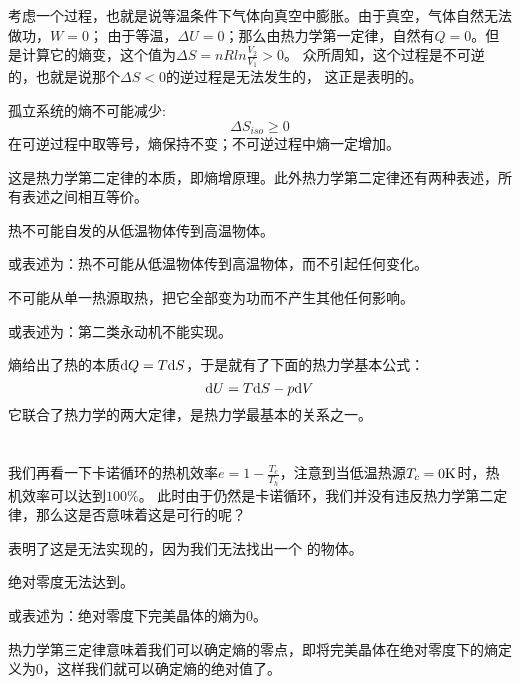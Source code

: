             考虑一个过程，也就是说等温条件下气体向真空中膨胀。由于真空，气体自然无法做功，$W=0$；
            由于等温，$\Delta U=0$；那么由热力学第一定律，自然有$Q=0$。但是计算它的熵变，这个值为$\Delta S = nRln\frac{V_2}{V_1}>0$。
            众所周知，这个过程是不可逆的，也就是说那个$\Delta S<0$的逆过程是无法发生的，
            这正是表明的。
            \begin{law}
                孤立系统的熵不可能减少:
                \begin{equation}
                    \Delta S_{iso} \geq 0
                    \nonumber
                \end{equation}
                在可逆过程中取等号，熵保持不变；不可逆过程中熵一定增加。
            \end{law}
            这是热力学第二定律的本质，即熵增原理。此外热力学第二定律还有两种表述，所有表述之间相互等价。
            \begin{law}
                热不可能自发的从低温物体传到高温物体。

                或表述为：热不可能从低温物体传到高温物体，而不引起任何变化。
            \end{law}
            \begin{law}
                不可能从单一热源取热，把它全部变为功而不产生其他任何影响。

                或表述为：第二类永动机不能实现。
            \end{law}
            熵给出了热的本质$\mathrm{d}{Q} = T\mathrm{d}{S}$，于是就有了下面的热力学基本公式：
            \begin{equation}
                \mathrm{d}{U} = T\mathrm{d}{S}-p\mathrm{d}{V}
                \nonumber
            \end{equation}
            它联合了热力学的两大定律，是热力学最基本的关系之一。
    \section[热力学第三定律]{}
        我们再看一下卡诺循环的热机效率$e = 1-\frac{T_c}{T_h}$，注意到当低温热源$T_c = 0 \rm{K}$时，热机效率可以达到$100\%$。
        此时由于仍然是卡诺循环，我们并没有违反热力学第二定律，那么这是否意味着这是可行的呢？

        表明了这是无法实现的，因为我们无法找出一个\linebreak{}
        的物体。
        \begin{law}
            绝对零度无法达到。

            或表述为：绝对零度下完美晶体的熵为$0$。
        \end{law}
        热力学第三定律意味着我们可以确定熵的零点，即将完美晶体在绝对零度下的熵定义为$0$，这样我们就可以确定熵的绝对值了。

